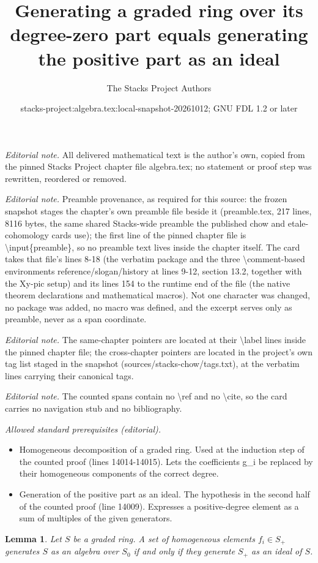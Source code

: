 \documentclass[10pt,a4paper]{amsart}
\title{Generating a graded ring over its degree-zero part equals generating the positive part as an ideal}
\author{The Stacks Project Authors}
\date{stacks-project:algebra.tex:local-snapshot-20261012; GNU FDL 1.2 or later}
\theoremstyle{plain}
\newtheorem{lemma}[subsection]{Lemma}
\theoremstyle{definition}
\theoremstyle{remark}
\numberwithin{equation}{subsection}
\begin{document}
\maketitle
\noindent\textit{Editorial note.} All delivered mathematical text is the author's own, copied from the pinned Stacks Project chapter file algebra.tex; no statement or proof step was rewritten, reordered or removed.\par\medskip
\noindent\textit{Editorial note.} Preamble provenance, as required for this source: the frozen snapshot stages the chapter's own preamble file beside it (preamble.tex, 217 lines, 8116 bytes, the same shared Stacks-wide preamble the published chow and etale-cohomology cards use); the first line of the pinned chapter file is \textbackslash{}input\{preamble\}, so no preamble text lives inside the chapter itself. The card takes that file's lines 8-18 (the verbatim package and the three \textbackslash{}comment-based environments reference/slogan/history at lines 9-12, section 13.2, together with the Xy-pic setup) and its lines 154 to the runtime end of the file (the native theorem declarations and mathematical macros). Not one character was changed, no package was added, no macro was defined, and the excerpt serves only as preamble, never as a span coordinate.\par\medskip
\noindent\textit{Editorial note.} The same-chapter pointers are located at their \textbackslash{}label lines inside the pinned chapter file; the cross-chapter pointers are located in the project's own tag list staged in the snapshot (sources/stacks-chow/tags.txt), at the verbatim lines carrying their canonical tags.\par\medskip
\noindent\textit{Editorial note.} The counted spans contain no \textbackslash{}ref and no \textbackslash{}cite, so the card carries no navigation stub and no bibliography.\par\medskip
\noindent\textit{Allowed standard prerequisites (editorial).}\begin{itemize}
\item Homogeneous decomposition of a graded ring. Used at the induction step of the counted proof (lines 14014-14015). Lets the coefficients g\_i be replaced by their homogeneous components of the correct degree.
\item Generation of the positive part as an ideal. The hypothesis in the second half of the counted proof (line 14009). Expresses a positive-degree element as a sum of multiples of the given generators.
\end{itemize}\medskip
\begin{lemma}
\label{lemma-S-plus-generated}
Let $S$ be a graded ring. A set of homogeneous elements
$f_i \in S_{+}$ generates $S$ as an algebra over $S_0$ if
and only if they generate $S_{+}$ as an ideal of $S$.
\end{lemma}
\end{document}
